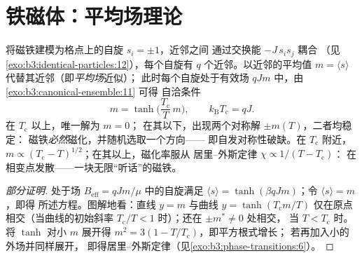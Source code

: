 \section{铁磁体：平均场理论}

\begin{theorem}[平均场伊辛相变]\label{thm:b3:phase-transitions:meanfield}
将磁铁建模为格点上的自旋 $s_i = \pm1$，近邻之间
通过交换能 $-J\,s_is_j$ 耦合
（见\cref{exo:b3:identical-particles:12}），每个自旋有 $q$
个近邻。以近邻的平均值 $m =
\langle s\rangle$ 代替其近邻（即\emph{平均场}近似）；
此时每个自旋处于有效场 $qJm$ 中，由
\cref{exo:b3:canonical-ensemble:11} 可得
自洽条件
\[
m = \tanh\!\Big(\frac{T_{\text{c}}}{T}\,m\Big) , \qquad
k_{\text{B}}T_{\text{c}} = qJ .
\]
在 $T_{\text{c}}$ 以上，唯一解为 $m = 0$；
在其以下，出现两个对称解 $\pm m(T)$，二者均稳定：
磁铁\emph{必然}磁化，并随机选取一个方向——
即自发对称性破缺。在 $T_{\text{c}}$ 附近，$m \propto
(T_{\text{c}} - T)^{1/2}$；在其以上，磁化率服从
居里–外斯定律 $\chi \propto 1/(T - T_{\text{c}})$：
在相变点发散——一块无限“听话”的磁铁。
\end{theorem}

\begin{proof}[部分证明]
处于场 $B_{\text{eff}} = qJm/\mu$ 中的自旋满足 $\langle s\rangle =
\tanh(\beta qJm)$；令 $\langle s\rangle = m$，即得
所述方程。图解地看：直线 $y = m$ 与曲线 $y =
\tanh(T_{\text{c}}m/T)$ 仅在原点相交（当曲线的初始斜率
$T_{\text{c}}/T < 1$ 时）；还在 $\pm m^* \neq 0$ 处相交，
当 $T < T_{\text{c}}$ 时。将 $\tanh$ 对小
$m$ 展开得 $m^2 = 3(1 - T/T_{\text{c}})$，即平方根式增长；
若再加入小的外场并同样展开，
即得居里–外斯定律（见\cref{exo:b3:phase-transitions:6}）。
\end{proof}

